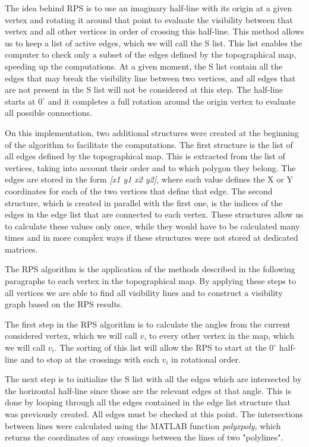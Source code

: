 \documentclass[journal]{IEEEtran}
\begin{document}
The idea behind RPS is to use an imaginary half-line with its origin at a given vertex and rotating it around that point to evaluate the visibility between that vertex and all other vertices in order of crossing this half-line. This method allows us to keep a list of active edges, which we will call the S list. This list enables the computer to check only a subset of the edges defined by the topographical map, speeding up the computations. At a given moment, the S list contain all the edges that may break the visibility line between two vertices, and all edges that are not present in the S list will not be considered at this step. The half-line starts at $0^{\circ}$ and it completes a full rotation around the origin vertex to evaluate all possible connections.

On this implementation, two additional structures were created at the beginning of the algorithm to facilitate the computations. The first structure is the list of all edges defined by the topographical map. This is extracted from the list of vertices, taking into account their order and to which polygon they belong. The edges are stored in the form \textit{[x1 y1 x2 y2]}, where each value defines the X or Y coordinates for each of the two vertices that define that edge. The second structure, which is created in parallel with the first one, is the indices of the edges in the edge list that are connected to each vertex. These structures allow us to calculate these values only once, while they would have to be calculated many times and in more complex ways if these structures were not stored at dedicated matrices.

The RPS algorithm is the application of the methods described in the following paragraphs to each vertex in the topographical map. By applying these steps to all vertices we are able to find all visibility lines and to construct a visibility graph based on the RPS results.

The first step in the RPS algorithm is to calculate the angles from the current considered vertex, which we will call $v$, to every other vertex in the map, which we will call $v_i$. The sorting of this list will allow the RPS to start at the $0^{\circ}$ half-line and to stop at the crossings with each $v_i$ in rotational order.

The next step is to initialize the S list with all the edges which are intersected by the horizontal half-line since those are the relevant edges at that angle. This is done by looping through all the edges contained in the edge list structure that was previously created. All edges must be checked at this point. The intersections between lines were calculated using the MATLAB function \textit{polyxpoly}, which returns the coordinates of any crossings between the lines of two "polylines".
\end{document}
